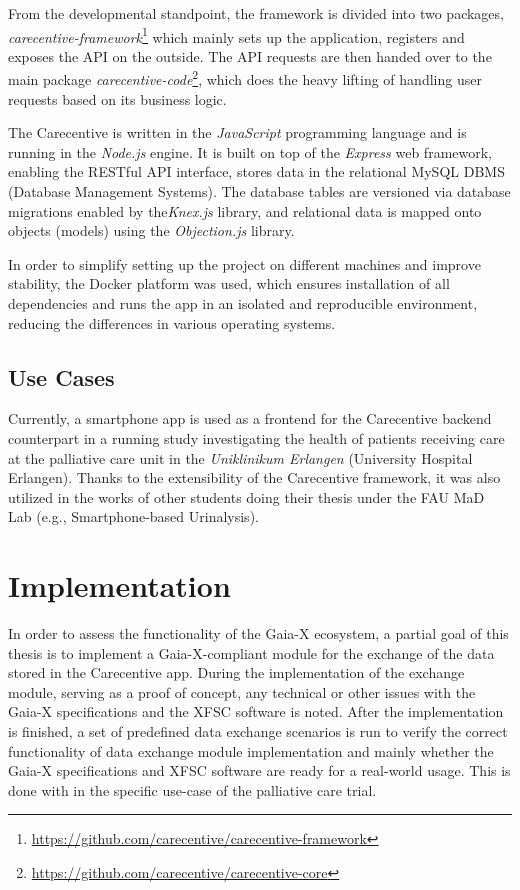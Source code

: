 From the developmental standpoint, the framework is divided into two packages, \textit{carecentive-framework}\footnote{\url{https://github.com/carecentive/carecentive-framework}} which mainly sets up the application, registers and exposes the API on the outside.
The API requests are then handed over to the main package \textit{carecentive-code}\footnote{\url{https://github.com/carecentive/carecentive-core}}, which does the heavy lifting of handling user requests based on its business logic.

The Carecentive is written in the \textit{JavaScript} programming language and is running in the \textit{Node.js} engine.
It is built on top of the \textit{Express} web framework, enabling the RESTful API interface, stores data in the relational MySQL DBMS (Database Management Systems).
The database tables are versioned via database migrations enabled by the\textit{Knex.js} library, and relational data is mapped onto objects (models) using the \textit{Objection.js} library.

In order to simplify setting up the project on different machines and improve stability, the Docker platform was used, which ensures installation of all dependencies and runs the app in an isolated and reproducible environment, reducing the differences in various operating systems.

\subsection{Use Cases}\label{subsec:use-cases}

Currently, a smartphone app is used as a frontend for the Carecentive backend counterpart in a running study investigating the health of patients receiving care at the palliative care unit in the \textit{Uniklinikum Erlangen} (University Hospital Erlangen).
Thanks to the extensibility of the Carecentive framework, it was also utilized in the works of other students doing their thesis under the FAU MaD Lab (e.g., Smartphone-based Urinalysis).


\section{Implementation}\label{sec:implementation}

In order to assess the functionality of the Gaia-X ecosystem, a partial goal of this thesis is to implement a Gaia-X-compliant module for the exchange of the data stored in the Carecentive app.
During the implementation of the exchange module, serving as a proof of concept, any technical or other issues with the Gaia-X specifications and the XFSC software is noted.
After the implementation is finished, a set of predefined data exchange scenarios is run to verify the correct functionality of data exchange module implementation and mainly whether the Gaia-X specifications and XFSC software are ready for a real-world usage.
This is done with in the specific use-case of the palliative care trial.

